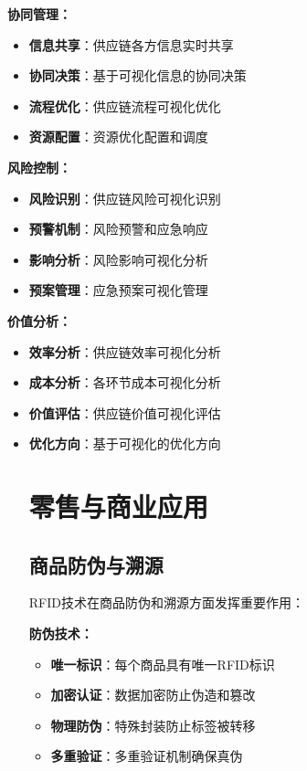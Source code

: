 \documentclass[12pt,UTF8]{ctexbook}
\begin{document}
\begin{itemize}[leftmargin=3.5em]
\begin{itemize}[leftmargin=3.5em]
\textbf{协同管理：}
\begin{itemize}[leftmargin=3.5em]
    \item \textbf{信息共享}：供应链各方信息实时共享
    \item \textbf{协同决策}：基于可视化信息的协同决策
    \item \textbf{流程优化}：供应链流程可视化优化
    \item \textbf{资源配置}：资源优化配置和调度
\end{itemize}

\textbf{风险控制：}
\begin{itemize}[leftmargin=3.5em]
    \item \textbf{风险识别}：供应链风险可视化识别
    \item \textbf{预警机制}：风险预警和应急响应
    \item \textbf{影响分析}：风险影响可视化分析
    \item \textbf{预案管理}：应急预案可视化管理
\end{itemize}

\textbf{价值分析：}
\begin{itemize}[leftmargin=3.5em]
    \item \textbf{效率分析}：供应链效率可视化分析
    \item \textbf{成本分析}：各环节成本可视化分析
    \item \textbf{价值评估}：供应链价值可视化评估
    \item \textbf{优化方向}：基于可视化的优化方向

\chapter{零售与商业应用}

\section{商品防伪与溯源}

RFID技术在商品防伪和溯源方面发挥重要作用：

\textbf{防伪技术：}
\begin{itemize}[leftmargin=3.5em]
    \item \textbf{唯一标识}：每个商品具有唯一RFID标识
    \item \textbf{加密认证}：数据加密防止伪造和篡改
    \item \textbf{物理防伪}：特殊封装防止标签被转移
    \item \textbf{多重验证}：多重验证机制确保真伪
\end{itemize}


\end{itemize}
\end{itemize}
\end{itemize}
\end{document}

